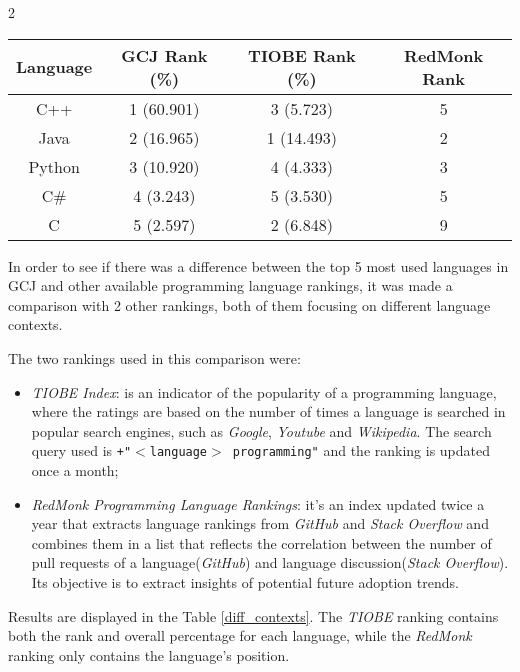\documentclass{article}
\begin{document}
\begin{multicols*}{2}
\begin{table*}[!ht]
\centering
\caption{Top 5 languages ranking in different contexts}
\label{diff_contexts}
\begin{tabular}{c|c|c|c}
\textbf{Language} & \textbf{GCJ Rank (\%)} & \textbf{TIOBE Rank (\%)} & \textbf{RedMonk Rank} \\ \hline
C++               & 1 (60.901)             & 3 (5.723)                & 5                     \\
Java              & 2 (16.965)             & 1 (14.493)               & 2                     \\
Python            & 3 (10.920)             & 4 (4.333)                & 3                     \\
C\#               & 4 (3.243)              & 5 (3.530)                & 5                     \\
C                 & 5 (2.597)              & 2 (6.848)                & 9
\end{tabular}
\end{table*}

In order to see if there was a difference between the top 5 most used languages in GCJ and other available programming language rankings, it was made a comparison with 2 other rankings, both of them focusing on different language contexts.

The two rankings used in this comparison were:
\begin{itemize}
    \item \textit{TIOBE Index}: is an indicator of the popularity of a programming language\cite{tiobe}, where the ratings are based on the number of times a language is searched in popular search engines, such as \textit{Google}, \textit{Youtube} and \textit{Wikipedia}. The search query used is \texttt{+"$<$language$>$ programming"} and the ranking is updated once a month;
    \item \textit{RedMonk Programming Language Rankings}: it's an index updated twice a year that extracts language rankings from \textit{GitHub} and \textit{Stack Overflow} and combines them in a list that reflects the correlation between the number of pull requests of a language(\textit{GitHub}) and language discussion(\textit{Stack Overflow})\cite{redmonk}. Its objective is to extract insights of potential future adoption trends.
\end{itemize}


Results are displayed in the Table \ref{diff_contexts}. The \textit{TIOBE} ranking contains both the rank and overall percentage for each language, while the \textit{RedMonk} ranking only contains the language's position.


\end{multicols*}
\end{document}
